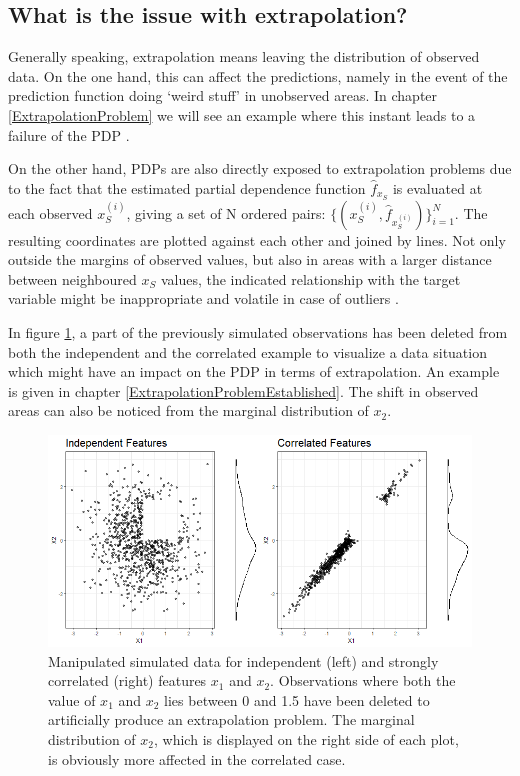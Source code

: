 \documentclass[]{krantz}
\begin{document}
\subsection{What is the issue with
extrapolation?}\label{what-is-the-issue-with-extrapolation}

Generally speaking, extrapolation means leaving the distribution of
observed data. On the one hand, this can affect the predictions, namely
in the event of the prediction function doing `weird stuff' in
unobserved areas. In chapter \ref{ExtrapolationProblem} we will see an
example where this instant leads to a failure of the PDP
\citep{molnar2019}.

On the other hand, PDPs are also directly exposed to extrapolation
problems due to the fact that the estimated partial dependence function
\(\hat{f}_{x_S}\) is evaluated at each observed \(x^{(i)}_{S}\), giving
a set of N ordered pairs:
\(\{(x^{(i)}_{S}, \hat{f}_{x^{(i)}_{S}})\}_{i=1}^N\). The resulting
coordinates are plotted against each other and joined by lines. Not only
outside the margins of observed values, but also in areas with a larger
distance between neighboured \(x_S\) values, the indicated relationship
with the target variable might be inappropriate and volatile in case of
outliers \citep{Goldstein2013}.

In figure \ref{fig:Figure02}, a part of the previously simulated
observations has been deleted from both the independent and the
correlated example to visualize a data situation which might have an
impact on the PDP in terms of extrapolation. An example is given in
chapter \ref{ExtrapolationProblemEstablished}. The shift in observed
areas can also be noticed from the marginal distribution of \(x_2\).

\begin{figure}
\includegraphics[width=1\linewidth]{images/VK_PDP_2_Data_ind_dep_gap} \caption{Manipulated simulated data for independent (left) and strongly correlated (right) features $x_1$ and $x_2$. Observations where both the value of $x_1$ and $x_2$ lies between 0 and 1.5 have been deleted to artificially produce an extrapolation problem. The marginal distribution of $x_2$, which is displayed on the right side of each plot, is obviously more affected in the correlated case.}\label{fig:Figure02}
\end{figure}
\end{document}
